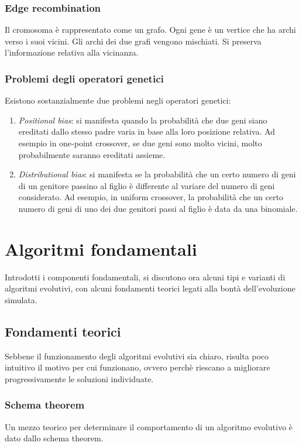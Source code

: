 \documentclass[a4paper]{article}
\begin{document}
\subsubsection{Edge recombination}
Il cromosoma è rappresentato come un grafo.
Ogni gene è un vertice che ha archi verso i suoi vicini. Gli archi dei due
grafi vengono mischiati. Si preserva l’informazione relativa alla vicinanza.

\subsubsection{Problemi degli operatori genetici}
Esistono sostanzialmente due problemi negli operatori genetici:
\begin{enumerate}
    \item \emph{Positional bias}: si manifesta quando la probabilità che due geni
    siano ereditati dallo stesso padre varia in base alla loro posizione relativa. Ad esempio
    in one-point crossover, se due geni sono molto vicini, molto probabilmente saranno ereditati
    assieme.
    \item \emph{Distributional bias}: si manifesta se la probabilità che un certo numero di geni 
    di un genitore passino al figlio è differente al variare del numero di geni considerato.
    Ad esempio, in uniform crossover, la probabilità che un certo numero di geni di uno dei due genitori
    passi al figlio è data da una binomiale. 
\end{enumerate}

\newpage
\section{Algoritmi fondamentali}
Introdotti i componenti fondamentali, si discutono ora alcuni tipi e varianti di algoritmi
evolutivi, con alcuni fondamenti teorici legati alla bontà dell'evoluzione simulata.

\subsection{Fondamenti teorici}
Sebbene il funzionamento degli algoritmi evolutivi sia chiaro, 
risulta poco intuitivo il motivo per cui funzionano, ovvero perchè riescano a 
migliorare progressivamente le soluzioni individuate.

\subsubsection{Schema theorem}
Un mezzo teorico per determinare il comportamento di un algoritmo evolutivo è dato 
dallo schema theorem.
\end{document}
